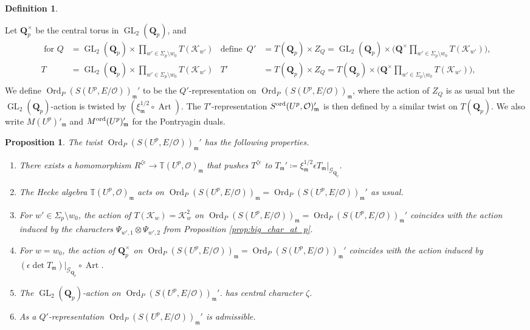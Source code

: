 \documentclass[leqno]{amsart}
\newtheorem{prop}[thm]{Proposition}
\theoremstyle{definition}
\newtheorem{defn}[thm]{Definition}
\theoremstyle{remark}
\newcommand{\oo}{\mathcal{O}}
\newcommand{\Q}{{\mathbf{Q}}}
\newcommand{\Qp}{\mathbf{Q}_p}
\DeclareMathOperator{\GL}{GL}
\DeclareMathOperator{\Art}{Art}
\newcommand{\fm}{\mathfrak{m}}
\DeclareMathOperator{\Ord}{Ord} %
\newcommand{\Gp}{\mathcal{G}_{\Qp}} %
\newcommand{\K}{{\mathcal{K}}} %
\newcommand{\TT}{\mathbb{T}} %
\newcommand{\ord}{\textnormal{ord}} %
\begin{document}
\begin{defn}\label{def:twist}

Let $\Qp^\times$ be the central torus in $\GL_2(\Qp)$, and 
\begin{align*}
\text{ for }
Q&=\GL_2(\Qp)\times \prod_{w'\in\Sigma_p\setminus{w_0}}T(\K_{w'}) & 
\text{define }\,
Q'&=T(\Qp)\times Z_Q=\GL_2(\Qp)\times 
\big(\Q^\times\prod_{w'\in\Sigma_p\setminus{w_0}}T(\K_{w'})\big),\\
T&=\GL_2(\Qp)\times \prod_{w'\in\Sigma_p\setminus{w_0}}T(\K_{w'}) & 
T'&=T(\Qp)\times Z_Q=T(\Qp)\times 
\big(\Q^\times\prod_{w'\in\Sigma_p\setminus{w_0}}T(\K_{w'})\big),\\
\end{align*}
We define $\Ord_P(S(U^p,E/\oo))_{\fm}'$
to be the $Q'$-representation on
$\Ord_P(S(U^p,E/\oo))_{\fm}$,
where the action of $Z_Q$ is as usual
but the $\GL_2(\Qp)$-action is twisted by 
$(\xi_{\fm}^{1/2}\circ\Art)$.
The $T'$-representation
$S^{\ord}(U^p,\oo)_\fm'$
is then defined by a similar twist on $T(\Qp)$.
We also write $M(U^p)'_\fm$ and $M^{\ord}(U^p)'_\fm$
for the Pontryagin duals.
\end{defn}

\begin{prop}\label{lem:twist}
The twist $\Ord_P(S(U^p,E/\oo))_\fm'$
has the following properties.
\begin{enumerate}
\item There exists a homomorphism 
$R^{\zeta\epsilon}\to \TT(U^p,\oo)_\fm$
that pushes $T^{\zeta\epsilon}$ to 
$T_\fm'\coloneqq \xi_{\fm}^{1/2}\epsilon T_\fm\vert_{\Gp}$.

\item The Hecke algebra $\TT(U^p,\oo)_{\fm}$
acts on $\Ord_P(S(U^p,E/\oo))_\fm=\Ord_P(S(U^p,E/\oo))_\fm'$
as usual.

\item For $w'\in \Sigma_p\setminus{w_0}$,
the action of $T(\K_w)=\K_w^2$ on
$\Ord_P(S(U^p,E/\oo))_\fm=\Ord_P(S(U^p,E/\oo))_\fm'$
coincides with the action induced by
the characters $\Psi_{w',1}\otimes\Psi_{w',2}$ from
Proposition \ref{prop:big_char_at_p}.
\item For $w=w_0$,
the action of $\Qp^\times$ on
$\Ord_P(S(U^p,E/\oo))_\fm=\Ord_P(S(U^p,E/\oo))_\fm'$
coincides with the action induced by
$(\epsilon\det T_\fm)\vert_{\Gp}\circ \Art$.
\item
The $\GL_2(\Qp)$-action on $\Ord_P(S(U^p,E/\oo))_\fm'$.
has central character $\zeta$.
\item 
As a $Q'$-representation
$\Ord_P(S(U^p,E/\oo))_\fm'$ is admissible.
\end{enumerate}
\end{prop}
\end{document}
